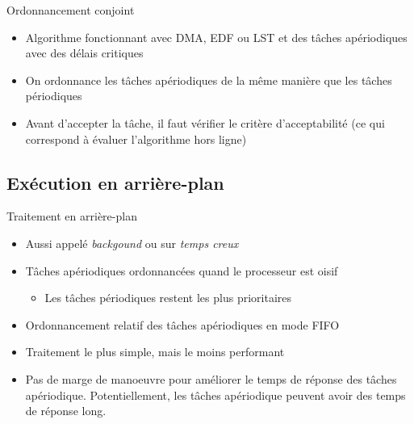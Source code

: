 \begin{frame}{Ordonnancement conjoint}
  \begin{itemize}
  \item Algorithme  fonctionnant avec  DMA, EDF ou  LST et  des tâches
    apériodiques avec des délais critiques
  \item On ordonnance  les tâches apériodiques de la  même manière que
    les tâches périodiques
  \item  Avant  d'accepter  la  tâche,  il faut  vérifier  le  critère
    d'acceptabilité  (ce qui  correspond à  évaluer  l'algorithme hors
    ligne)
  \end{itemize}
\end{frame}


\subsection{Exécution en arrière-plan}

\begin{frame}{Traitement en arrière-plan}
  \begin{itemize}
  \item Aussi appelé \emph{backgound} ou sur \emph{temps creux}
  \item Tâches apériodiques ordonnancées quand le processeur est oisif
    \begin{itemize}
    \item Les tâches périodiques restent les plus prioritaires
    \end{itemize}
  \item Ordonnancement relatif des tâches apériodiques en mode FIFO
  \item Traitement le plus simple, mais le moins performant
  \item Pas de  marge de manoeuvre pour améliorer  le temps de réponse
    des  tâches apériodique.  Potentiellement, les  tâches apériodique
    peuvent avoir des temps de réponse long.
  \end{itemize}
\end{frame}

